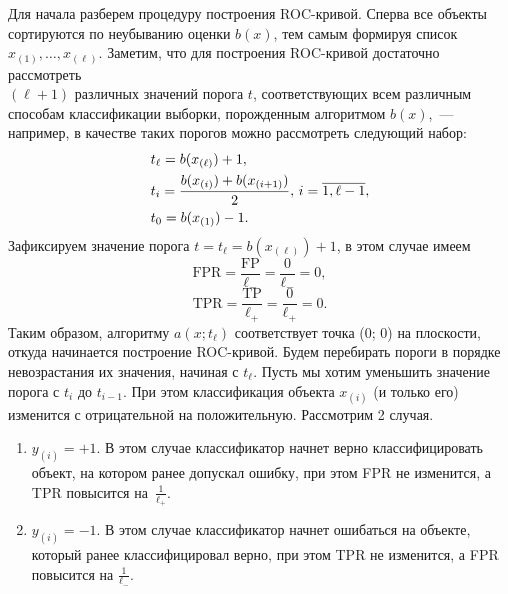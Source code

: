 \documentclass[12pt,a4paper]{article}
\begin{document}
	\begin{esSolution}
	Для начала разберем процедуру построения ROC-кривой. Сперва все объекты сортируются по неубыванию оценки $b(x)$, тем самым формируя список $x_{(1)}, \dots, x_{(\ell)}.$ Заметим, что для построения ROC-кривой достаточно рассмотреть\\ $(\ell+1)$ различных значений порога $t$, соответствующих всем различным способам классификации выборки, порожденным алгоритмом $b(x)$,~--- например, в качестве таких порогов можно рассмотреть следующий набор:
	\begin{align*}
		\hspace*{-5cm}&t_\ell = b(x_{(\ell)}) + 1,\\
		&t_i = \frac{b(x_{(i)}) + b(x_{(i+1)})}{2} , \, i = \overline{1, \ell -1},\\
		&t_0 = b(x_{(1)}) - 1.
	\end{align*}	
	Зафиксируем значение порога $t = t_\ell =  b(x_{(\ell)}) + 1$, в этом случае имеем
	$$\text{FPR} = \frac{\text{FP}}{\ell_-} = \frac{0}{\ell_-} = 0,$$
	$$\text{TPR} = \frac{\text{TP}}{\ell_+} = \frac{0}{\ell_+} = 0.$$
	Таким образом, алгоритму $a(x; t_\ell)$ соответствует точка (0; 0) на плоскости, откуда начинается построение ROC-кривой.
		 Будем перебирать пороги в порядке невозрастания их значения, начиная с $t_{\ell}$. Пусть мы хотим уменьшить значение порога с $t_i$ до $t_{i-1}$. При этом классификация объекта $x_{(i)}$ (и только его) изменится с отрицательной на положительную. Рассмотрим 2 случая.
	
	\begin{figure}[H]
		\label{ris:image}
	\end{figure}


	\begin{enumerate}
		\item $y_{(i)} = +1.$ В этом случае классификатор начнет верно классифицировать объект, на котором ранее допускал ошибку, при этом FPR не изменится, а TPR повысится на~$\frac{1}{\ell_+}.$
		\item $y_{(i)} = -1.$ В этом случае классификатор начнет ошибаться на объекте, который ранее классифицировал верно, при этом TPR не изменится, а FPR повысится на  $\frac{1}{\ell_-}.$
	
	\end{enumerate}
	

\end{esSolution}
\end{document}
